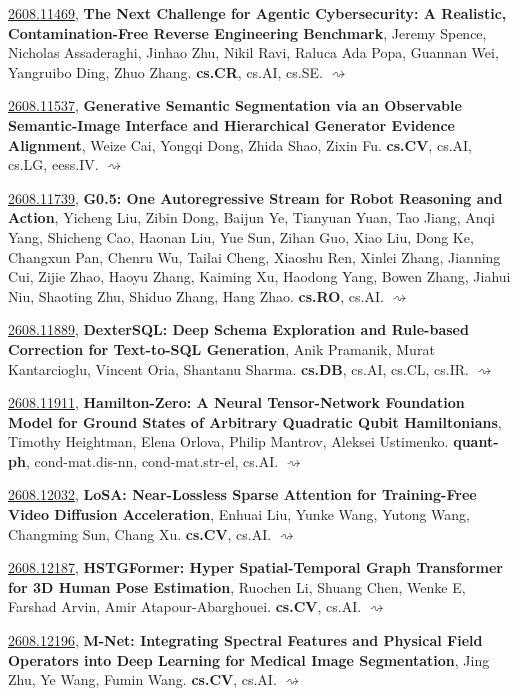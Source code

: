 \documentclass[9pt, a4paper]{article}
\theoremstyle{plain}
\theoremstyle{definition}
\theoremstyle{remark}
\newcommand{\arxiv}[3]{\href{https://arxiv.org/abs/#1}{#1}, \textbf{\textcolor{arxivblue}{#2}}, #3. }
\begin{document}
\arxiv{2608.11469}{The Next Challenge for Agentic Cybersecurity: A Realistic, Contamination-Free Reverse Engineering Benchmark}{Jeremy Spence, Nicholas Assaderaghi, Jinhao Zhu, Nikil Ravi, Raluca Ada Popa, Guannan Wei, Yangruibo Ding, Zhuo Zhang}\textbf{cs.CR}, cs.AI, cs.SE. \hyperlink{2608.11469}{$\rightsquigarrow$}

\arxiv{2608.11537}{Generative Semantic Segmentation via an Observable Semantic-Image Interface and Hierarchical Generator Evidence Alignment}{Weize Cai, Yongqi Dong, Zhida Shao, Zixin Fu}\textbf{cs.CV}, cs.AI, cs.LG, eess.IV. \hyperlink{2608.11537}{$\rightsquigarrow$}

\arxiv{2608.11739}{G0.5: One Autoregressive Stream for Robot Reasoning and Action}{Yicheng Liu, Zibin Dong, Baijun Ye, Tianyuan Yuan, Tao Jiang, Anqi Yang, Shicheng Cao, Haonan Liu, Yue Sun, Zihan Guo, Xiao Liu, Dong Ke, Changxun Pan, Chenru Wu, Tailai Cheng, Xiaoshu Ren, Xinlei Zhang, Jianning Cui, Zijie Zhao, Haoyu Zhang, Kaiming Xu, Haodong Yang, Bowen Zhang, Jiahui Niu, Shaoting Zhu, Shiduo Zhang, Hang Zhao}\textbf{cs.RO}, cs.AI. \hyperlink{2608.11739}{$\rightsquigarrow$}

\arxiv{2608.11889}{DexterSQL: Deep Schema Exploration and Rule-based Correction for Text-to-SQL Generation}{Anik Pramanik, Murat Kantarcioglu, Vincent Oria, Shantanu Sharma}\textbf{cs.DB}, cs.AI, cs.CL, cs.IR. \hyperlink{2608.11889}{$\rightsquigarrow$}

\arxiv{2608.11911}{Hamilton-Zero: A Neural Tensor-Network Foundation Model for Ground States of Arbitrary Quadratic Qubit Hamiltonians}{Timothy Heightman, Elena Orlova, Philip Mantrov, Aleksei Ustimenko}\textbf{quant-ph}, cond-mat.dis-nn, cond-mat.str-el, cs.AI. \hyperlink{2608.11911}{$\rightsquigarrow$}

\arxiv{2608.12032}{LoSA: Near-Lossless Sparse Attention for Training-Free Video Diffusion Acceleration}{Enhuai Liu, Yunke Wang, Yutong Wang, Changming Sun, Chang Xu}\textbf{cs.CV}, cs.AI. \hyperlink{2608.12032}{$\rightsquigarrow$}

\arxiv{2608.12187}{HSTGFormer: Hyper Spatial-Temporal Graph Transformer for 3D Human Pose Estimation}{Ruochen Li, Shuang Chen, Wenke E, Farshad Arvin, Amir Atapour-Abarghouei}\textbf{cs.CV}, cs.AI. \hyperlink{2608.12187}{$\rightsquigarrow$}

\arxiv{2608.12196}{M-Net: Integrating Spectral Features and Physical Field Operators into Deep Learning for Medical Image Segmentation}{Jing Zhu, Ye Wang, Fumin Wang}\textbf{cs.CV}, cs.AI. \hyperlink{2608.12196}{$\rightsquigarrow$}
\end{document}
